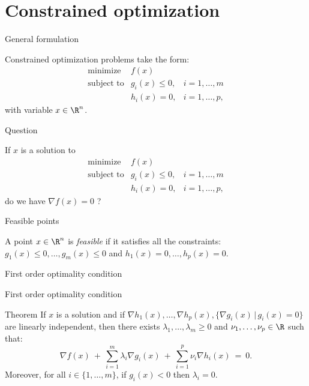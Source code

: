 \documentclass{beamer}
\begin{document}
\section{Constrained optimization}

\begin{frame}[t]{General formulation}
	\grid

	Constrained optimization problems take the form:
	$$
	\begin{array}{lll}
		\text{minimize} & f(x) & \\
		\text{subject to} & g_i(x) \leq 0, & i=1, \dots, m \\
						  & h_i(x) = 0, & i=1, \dots, p,
	\end{array}
	$$
	with variable $x \in \R^n$.
\end{frame}

\begin{frame}[t]{Question}
	\grid

	If $x$ is a solution to
	$$
		\begin{array}{lll}
			\text{minimize} & f(x) & \\
			\text{subject to} & g_i(x) \leq 0, & i=1, \dots, m \\
							  & h_i(x) = 0, & i=1, \dots, p,
		\end{array}
		$$
	do we have $\nabla f(x) = 0$ ?
\end{frame}

\begin{frame}[t]{Feasible points}
	\grid
	\begin{definition}
		A point $x \in \R^n$ is \emph{feasible} if it satisfies all the constraints: $g_1(x) \leq 0, \dots, g_m(x)\leq  0$ and $h_1(x) = 0, \dots, h_p(x) = 0$. 
	\end{definition}


\end{frame}

\begin{frame}[t]{First order optimality condition}
	\grid

	\pause
	\pause
\end{frame}

\begin{frame}[t]{First order optimality condition}
	\grid

	\vspace{-0.4cm}
	\begin{block}{Theorem}
		If $x$ is a solution and if $\nabla h_1(x), \dots, \nabla h_p(x), \{\nabla g_i(x) \, | \, g_i(x) = 0 \}$ are linearly independent,
		then there exists $\lambda_1, \dots, \lambda_m \geq 0$ and $\nu_1, \dots, \nu_p \in \R$ such that:
		\begin{equation}\label{eq:kkt1}
			\nabla f(x) \ + \ \sum_{i=1}^m \lambda_i \nabla g_i(x) \ + \ \sum_{i=1}^p \nu_i \nabla h_i(x)  \ = \ 0.
		\end{equation}
		Moreover, for all  $i\in \{1, \dots, m\}$, if $g_i(x) < 0$ then $\lambda_i = 0$.
	\end{block}

\end{frame}
\end{document}
